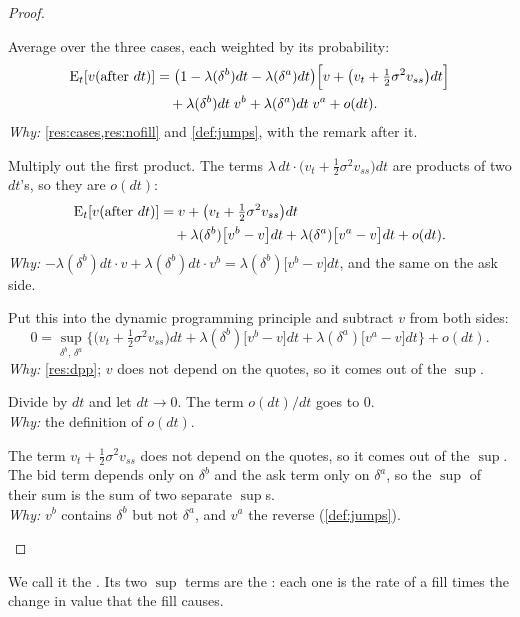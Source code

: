 \begin{proof}
\begin{steps}
  \item Average over the three cases, each weighted by its probability:
  \[
    \begin{aligned}
      \operatorname{E}_t\!\left[v(\text{after }dt)\right]
      &=\big(1-\lambda(\delta^b)dt-\lambda(\delta^a)dt\big)\Big[v+\big(v_t+\tfrac12\sigma^2v_{ss}\big)dt\Big]\\
      &\quad+\lambda(\delta^b)dt\;v^b+\lambda(\delta^a)dt\;v^a+o(dt).
    \end{aligned}
  \]
  \emph{Why:} \cref{res:cases,res:nofill} and \cref{def:jumps}, with the remark after it.
  \item Multiply out the first product. The terms $\lambda\,dt\cdot\big(v_t+\tfrac12\sigma^2v_{ss}\big)dt$ are products of two $dt$'s, so they are $o(dt)$:
  \[
    \begin{aligned}
      \operatorname{E}_t\!\left[v(\text{after }dt)\right]
      &=v+\big(v_t+\tfrac12\sigma^2v_{ss}\big)dt\\
      &\quad+\lambda(\delta^b)\big[v^b-v\big]dt+\lambda(\delta^a)\big[v^a-v\big]dt+o(dt).
    \end{aligned}
  \]
  \emph{Why:} $-\lambda(\delta^b)dt\cdot v+\lambda(\delta^b)dt\cdot v^b=\lambda(\delta^b)\big[v^b-v\big]dt$, and the same on the ask side.
  \item Put this into the dynamic programming principle and subtract $v$ from both sides:
  \[
    0=\sup_{\delta^b,\,\delta^a}\Big\{\big(v_t+\tfrac12\sigma^2v_{ss}\big)dt+\lambda(\delta^b)\big[v^b-v\big]dt+\lambda(\delta^a)\big[v^a-v\big]dt\Big\}+o(dt).
  \]
  \emph{Why:} \cref{res:dpp}; $v$ does not depend on the quotes, so it comes out of the $\sup$.
  \item Divide by $dt$ and let $dt\to0$. The term $o(dt)/dt$ goes to $0$.
  \\ \emph{Why:} the definition of $o(dt)$.
  \item The term $v_t+\tfrac12\sigma^2v_{ss}$ does not depend on the quotes, so it comes out of the $\sup$. The bid term depends only on $\delta^b$ and the ask term only on $\delta^a$, so the $\sup$ of their sum is the sum of two separate $\sup$s.
  \\ \emph{Why:} $v^b$ contains $\delta^b$ but not $\delta^a$, and $v^a$ the reverse (\cref{def:jumps}).
\end{steps}
\end{proof}

We call it the . Its two $\sup$ terms are the : each one is the rate of a fill times the change in value that the fill causes.

